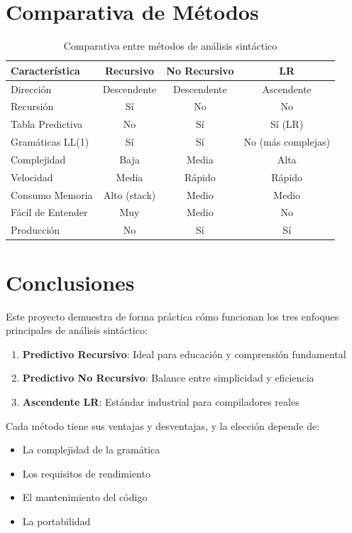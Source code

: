 \documentclass[12pt]{article}
\begin{document}
\section{Comparativa de Métodos}

\begin{table}[h]
\centering
\begin{tabular}{|l|c|c|c|}
\hline
\textbf{Característica} & \textbf{Recursivo} & \textbf{No Recursivo} & \textbf{LR} \\
\hline
Dirección & Descendente & Descendente & Ascendente \\
\hline
Recursión & Sí & No & No \\
\hline
Tabla Predictiva & No & Sí & Sí (LR) \\
\hline
Gramáticas LL(1) & Sí & Sí & No (más complejas) \\
\hline
Complejidad & Baja & Media & Alta \\
\hline
Velocidad & Media & Rápido & Rápido \\
\hline
Consumo Memoria & Alto (stack) & Medio & Medio \\
\hline
Fácil de Entender & Muy & Medio & No \\
\hline
Producción & No & Sí & Sí \\
\hline
\end{tabular}
\caption{Comparativa entre métodos de análisis sintáctico}
\end{table}

\section{Conclusiones}

Este proyecto demuestra de forma práctica cómo funcionan los tres enfoques principales de análisis sintáctico:

\begin{enumerate}
    \item \textbf{Predictivo Recursivo}: Ideal para educación y comprensión fundamental
    \item \textbf{Predictivo No Recursivo}: Balance entre simplicidad y eficiencia
    \item \textbf{Ascendente LR}: Estándar industrial para compiladores reales
\end{enumerate}

Cada método tiene sus ventajas y desventajas, y la elección depende de:
\begin{itemize}
    \item La complejidad de la gramática
    \item Los requisitos de rendimiento
    \item El mantenimiento del código
    \item La portabilidad
\end{itemize}
\end{document}
